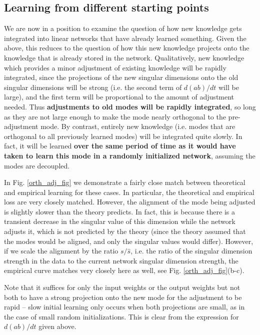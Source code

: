 \documentclass{article}
\begin{document}
\subsection{Learning from different starting points}
We are now in a position to examine the question of how new knowledge gets integrated into linear networks that have already learned something. Given the above, this reduces to the question of how this new knowledge projects onto the knowledge that is already stored in the network. Qualitatively, new knowledge which provides a minor adjustment of existing knowledge will be rapidly integrated, since the projections of the new singular dimensions onto the old singular dimensions will be strong (i.e. the second term of $d(ab)/dt$ will be large), and the first term will be proportional to the amount of adjustment needed. Thus \textbf{adjustments to old modes will be rapidly integrated}, so long as they are not large enough to make the mode nearly orthogonal to the pre-adjustment mode. By contrast, entirely new knowledge (i.e. modes that are orthogonal to all previously learned modes) will be integrated quite slowly. In fact, it will be learned \textbf{over the same period of time as it would have taken to learn this mode in a randomly initialized network}, assuming the modes are decoupled. \par
In Fig. \ref{orth_adj_fig} we demonstrate a fairly close match between theoretical and empirical learning for these cases. In particular, the theoretical and empirical loss are very closely matched. However, the alignment of the mode being adjusted is slightly slower than the theory predicts. In fact, this is because there is a transient decrease in the singular value of this dimension while the network adjusts it, which is not predicted by the theory (since the theory assumed that the modes would be aligned, and only the singular values would differ). However, if we scale the alignment by the ratio $s/\hat{s}$, i.e. the ratio of the singular dimension strength in the data to the current network singular dimension strength, the empirical curve matches very closely here as well, see Fig. \ref{orth_adj_fig}(b-c).\par 
Note that it suffices for only the input weights or the output weights but not both to have a strong projection onto the new mode for the adjustment to be rapid -- slow initial learning only occurs when both projections are small, as in the case of small random initializations. This is clear from the expression for ${d(ab)}/{dt}$ given above. \par
\end{document}
